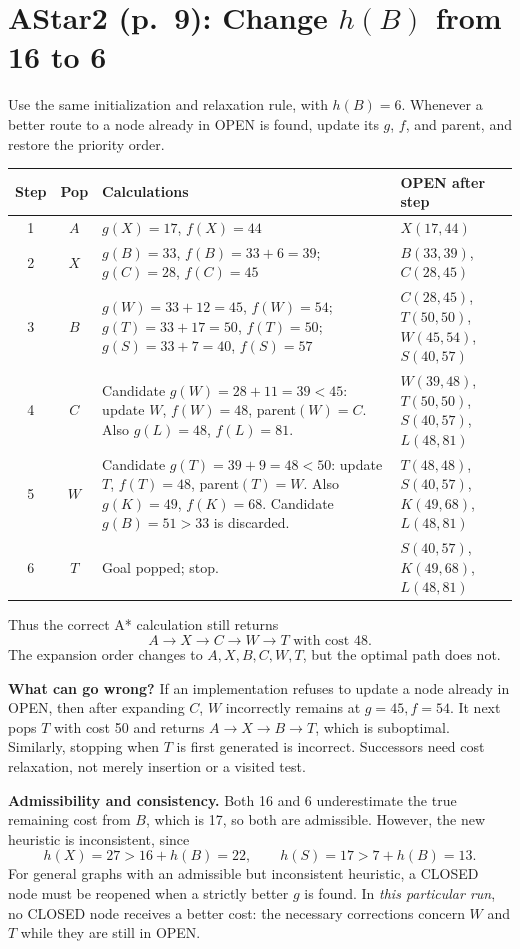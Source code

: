 \documentclass[11pt,a4paper]{article}
\newcommand{\question}[2]{\section*{#1: #2}}
\begin{document}
\newpage
\question{AStar2 (p.\ 9)}{Change $h(B)$ from 16 to 6}
Use the same initialization and relaxation rule, with $h(B)=6$. Whenever a better route to a node already in OPEN is found, update its $g$, $f$, and parent, and restore the priority order.
\begin{center}\small\begin{tabular}{c|c|>{\raggedright\arraybackslash}p{6.2cm}|>{\raggedright\arraybackslash}p{4.6cm}}\toprule
Step&Pop&Calculations&OPEN after step\\\midrule
1&$A$&$g(X)=17$, $f(X)=44$&$X(17,44)$\\
2&$X$&$g(B)=33$, $f(B)=33+6=39$; $g(C)=28$, $f(C)=45$&$B(33,39)$, $C(28,45)$\\
3&$B$&$g(W)=33+12=45$, $f(W)=54$; $g(T)=33+17=50$, $f(T)=50$; $g(S)=33+7=40$, $f(S)=57$&$C(28,45)$, $T(50,50)$, $W(45,54)$, $S(40,57)$\\
4&$C$&Candidate $g(W)=28+11=39<45$: update $W$, $f(W)=48$, parent$(W)=C$. Also $g(L)=48$, $f(L)=81$.&$W(39,48)$, $T(50,50)$, $S(40,57)$, $L(48,81)$\\
5&$W$&Candidate $g(T)=39+9=48<50$: update $T$, $f(T)=48$, parent$(T)=W$. Also $g(K)=49$, $f(K)=68$. Candidate $g(B)=51>33$ is discarded.&$T(48,48)$, $S(40,57)$, $K(49,68)$, $L(48,81)$\\
6&$T$&Goal popped; stop.&$S(40,57)$, $K(49,68)$, $L(48,81)$\\\bottomrule\end{tabular}\normalsize\end{center}
Thus the correct A* calculation still returns
\[
\boxed{A\to X\to C\to W\to T\text{ with cost }48}.
\]
The expansion order changes to $A,X,B,C,W,T$, but the optimal path does not.

\textbf{What can go wrong?} If an implementation refuses to update a node already in OPEN, then after expanding $C$, $W$ incorrectly remains at $g=45,f=54$. It next pops $T$ with cost 50 and returns $A\to X\to B\to T$, which is suboptimal. Similarly, stopping when $T$ is first generated is incorrect. Successors need cost relaxation, not merely insertion or a visited test.

\textbf{Admissibility and consistency.} Both 16 and 6 underestimate the true remaining cost from $B$, which is 17, so both are admissible. However, the new heuristic is inconsistent, since
\[
h(X)=27>16+h(B)=22,\qquad h(S)=17>7+h(B)=13.
\]
For general graphs with an admissible but inconsistent heuristic, a CLOSED node must be reopened when a strictly better $g$ is found. In \emph{this particular run}, no CLOSED node receives a better cost: the necessary corrections concern $W$ and $T$ while they are still in OPEN.
\end{document}
